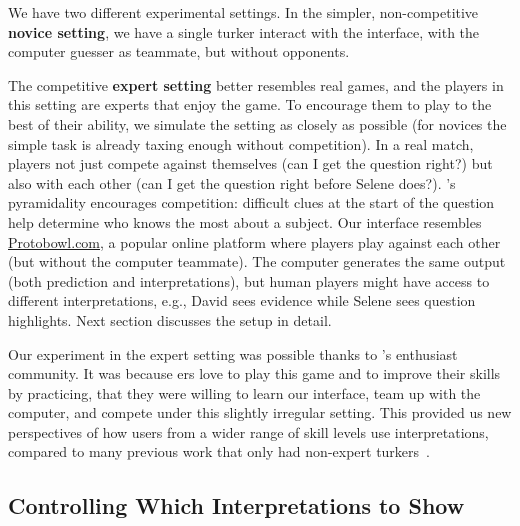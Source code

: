 We have two different experimental settings. In the simpler,
non-competitive \textbf{novice setting}, we have a single turker
interact with the interface, with the computer guesser
as teammate, but without opponents.

The competitive \textbf{expert setting} better resembles real \qb{}
games, and the players in this setting are experts
that enjoy the game.
To encourage them to play to the best of their ability, we
simulate the \qb{} setting as closely as possible (for novices the
simple task is already taxing enough without competition).  In a real
\qb{} match, players not just compete against themselves (can I get
the question right?) but also with each other (can I get the question
right before Selene does?).  \qb{}'s pyramidality
encourages competition: difficult clues at the start of the
question help determine who knows the most about a subject.
Our interface resembles \url{Protobowl.com}, a popular online \qb{}
platform where players play against each other (but
without the computer teammate).  The computer generates the same
output (both prediction and interpretations), but human players might
have access to different interpretations, e.g., David sees evidence while
Selene sees question highlights. Next section discusses the setup in
detail. 

Our experiment in the expert setting was possible thanks to \qb{}'s
enthusiast community. It was because \qb{}ers love to play this game
and to improve their skills by practicing, that they were willing to
learn our interface, team up with the computer, and compete under this
slightly irregular setting.  This provided us new perspectives of how
users from a wider range of skill levels use interpretations,
compared to many previous work that only had non-expert
turkers~\cite{smith2017evaluating,kneusel2017improving,clark2018creative}.

\subsection{Controlling Which Interpretations to Show}

